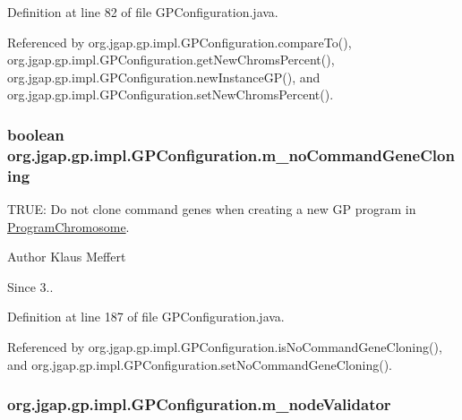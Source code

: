 Definition at line 82 of file G\-P\-Configuration.\-java.



Referenced by org.\-jgap.\-gp.\-impl.\-G\-P\-Configuration.\-compare\-To(), org.\-jgap.\-gp.\-impl.\-G\-P\-Configuration.\-get\-New\-Chroms\-Percent(), org.\-jgap.\-gp.\-impl.\-G\-P\-Configuration.\-new\-Instance\-G\-P(), and org.\-jgap.\-gp.\-impl.\-G\-P\-Configuration.\-set\-New\-Chroms\-Percent().

\hypertarget{classorg_1_1jgap_1_1gp_1_1impl_1_1_g_p_configuration_afb7d9007a6f671fe355f60380e7cac71}{
\subsubsection[{m\-\_\-no\-Command\-Gene\-Cloning}]{\setlength{\rightskip}{0pt plus 5cm}boolean org.\-jgap.\-gp.\-impl.\-G\-P\-Configuration.\-m\-\_\-no\-Command\-Gene\-Cloning\hspace{0.3cm}{\ttfamily [private]}}}\label{classorg_1_1jgap_1_1gp_1_1impl_1_1_g_p_configuration_afb7d9007a6f671fe355f60380e7cac71}
T\-R\-U\-E\-: Do not clone command genes when creating a new G\-P program in \hyperlink{classorg_1_1jgap_1_1gp_1_1impl_1_1_program_chromosome}{Program\-Chromosome}.

\begin{DoxyAuthor}{Author}
Klaus Meffert 
\end{DoxyAuthor}
\begin{DoxySince}{Since}
3.. 
\end{DoxySince}


Definition at line 187 of file G\-P\-Configuration.\-java.



Referenced by org.\-jgap.\-gp.\-impl.\-G\-P\-Configuration.\-is\-No\-Command\-Gene\-Cloning(), and org.\-jgap.\-gp.\-impl.\-G\-P\-Configuration.\-set\-No\-Command\-Gene\-Cloning().

\hypertarget{classorg_1_1jgap_1_1gp_1_1impl_1_1_g_p_configuration_a013d8eea3915f50de16e325dd3158295}{
\subsubsection[{m\-\_\-node\-Validator}]{ org.\-jgap.\-gp.\-impl.\-G\-P\-Configuration.\-m\-\_\-node\-Validator\hspace{0.3cm}{\ttfamily [private]}}}\label{classorg_1_1jgap_1_1gp_1_1impl_1_1_g_p_configuration_a013d8eea3915f50de16e325dd3158295}


